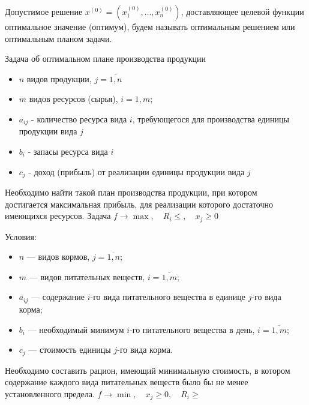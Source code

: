 \documentclass[17pt]{extarticle}
\begin{document}
\begin{definition}
    Допустимое решение \( x^{(0)} = (x_1^{(0)}, \ldots, x_n^{(0)}) \),
    доставляющее целевой функции оптимальное значение (оптимум),
    будем называть оптимальным решением или оптимальным планом задачи.
\end{definition}

\begin{definition}
    Задача об оптимальном плане производства продукции
    \begin{itemize}
        \item $n$ видов продукции, $j = \overline{1, n}$
        \item $m$ видов ресурсов (сырья), $i = 1, m;$
        \item $a_{ij}$ - количество ресурса вида $i$, требующегося для производства единицы продукции вида $j$
        \item $b_i$ - запасы ресурса вида $i$
        \item $c_j$ - доход (прибыль) от реализации единицы продукции вида $j$
    \end{itemize}
    Необходимо найти такой план производства продукции, при котором \\ достигается максимальная прибыль,
    для реализации которого достаточно имеющихся ресурсов. Задача $f \rightarrow \max, \quad R_i \leq, \quad x_j \geq 0$
\end{definition}


\begin{definition}
    Условия:
    \begin{itemize}
        \item \( n \) — видов кормов, \( j =\overline{1, n} \);
        \item \( m \) — видов питательных веществ, \( i =\overline{1, m} \);
        \item \( a_{ij} \) — содержание \( i \)-го вида питательного вещества в единице \( j \)-го вида корма;
        \item \( b_i \) — необходимый минимум \( i \)-го питательного вещества в день, \( i=\overline{1,m} \);
        \item \( c_j \) — стоимость единицы \( j \)-го вида корма.
    \end{itemize}

    Необходимо составить рацион, имеющий минимальную стоимость,
    в котором содержание каждого вида питательных веществ было бы не менее установленного предела.
    $f \rightarrow \min, \quad x_j \geq 0, \quad R_i \geq$
\end{definition}
\end{document}
